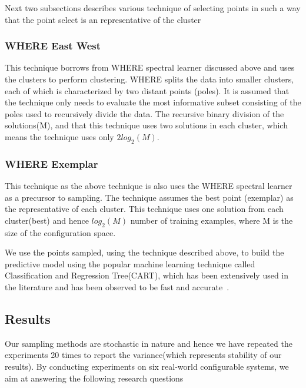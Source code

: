 \documentclass{sig-alternative}
\begin{document}
Next two subsections describes various technique of selecting points in such a way that the point select is an representative of the cluster
\subsubsection{WHERE East West}\label{where_east_west}
This technique borrows from WHERE spectral learner discussed above and uses the clusters to perform clustering. WHERE splits the data into smaller clusters, each of which is characterized by two distant points (poles). 
It is assumed  that the technique only needs to evaluate
the most informative subset consisting of the poles used to
recursively divide the data. The recursive binary division of the solutions(M), and that this technique uses two solutions in each cluster, which means the technique uses only $2log_2(M)$.

\subsubsection{WHERE Exemplar}\label{where_exemplar}
This technique as the above technique is also uses the WHERE spectral learner as a precursor to sampling. The technique assumes the best point (exemplar) as the representative of each cluster. This technique uses one solution from each cluster(best) and hence $log_2(M)$ number of training examples, where M is the size of the configuration space.



We use the points sampled, using the technique described above, to build the predictive model using the popular machine learning technique called Classification and Regression Tree(CART), which has been extensively used in the literature and has been observed to be fast and accurate~\cite{guo2013variability}.

\subsection{Results}
Our sampling methods are stochastic in nature and hence we have repeated the experiments 20 times to report the variance(which represents stability of our results). 
By conducting experiments on six real-world configurable systems, we aim at answering the following research questions
\end{document}
